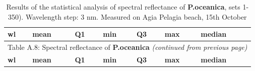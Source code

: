 \documentclass[10pt, a4paper]{article}
\begin{document}
\begin{appendices}
\begin{longtable}{|c|c|c|c|c|c|c|}
	\caption{Results of the statistical analysis of spectral reflectance of \textbf{P.oceanica}, sets 1-350). Wavelength step: 3 nm. Measured on Agia Pelagia beach, 15th October}\label{tab:A.8} \\
	  \multicolumn{1}{|l|}{\textbf{wl}} &
	   \multicolumn{1}{l|}{\textbf{mean}} & 
	   \multicolumn{1}{l|}{\textbf{Q1}} & 
	   \multicolumn{1}{l|}{\textbf{min}} & 
	   \multicolumn{1}{l|}{\textbf{Q3}} & 
	   \multicolumn{1}{l|}{\textbf{max}} & 
	   \multicolumn{1}{l|}{\textbf{median}} \\ \hline
	\endfirsthead

	\multicolumn{7}{c}{Table A.8: Spectral reflectance of \textbf{P.oceanica} \textit{(continued from previous page)}}\\
	\hline \multicolumn{1}{|l|}{\textbf{wl}} & \multicolumn{1}{l|}{\textbf{mean}} & \multicolumn{1}{l|}{\textbf{Q1}} & \multicolumn{1}{l|}{\textbf{min}} & \multicolumn{1}{l|}{\textbf{Q3}} & \multicolumn{1}{l|}{\textbf{max}} & \multicolumn{1}{l|}{\textbf{median}} \\ \hline
	\endhead


\end{longtable}
\end{appendices}
\end{document}
